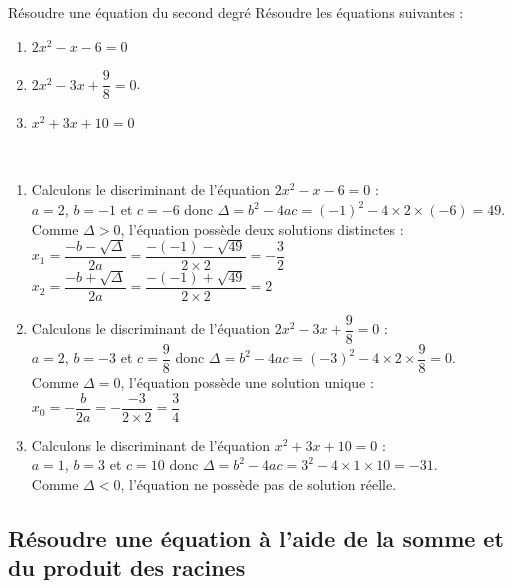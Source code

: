         
    \begin{methodeTitre}{Résoudre une équation du second degré}
         Résoudre les équations suivantes : 
        \begin{enumerate}
            \item $2x^2-x-6=0$
            \item $2x^2-3x+\dfrac{9}{8}=0$.
            \item $x^2+3x+10=0$
        \end{enumerate}
        \\
        \begin{enumerate}
            \item Calculons le discriminant de l'équation $2x^2-x-6=0$ :\\
            $a = 2$, $b = -1$ et $c = -6$ donc $\Delta = b^2-4ac = (-1)^2 - 4 \times 2 \times (-6) = 49$.\\
            Comme $\Delta > 0$, l'équation possède deux solutions distinctes :\\
            \hspace*{2cm} $x_1= \dfrac{-b-\sqrt{\Delta}}{2a}=\dfrac{-(-1)-\sqrt{49}}{2\times2}=-\dfrac{3}{2}$\\
            \hspace*{2cm} $x_2= \dfrac{-b+\sqrt{\Delta}}{2a}=\dfrac{-(-1)+\sqrt{49}}{2\times2}=2$
            \item Calculons le discriminant de l'équation $2x^2-3x+\dfrac{9}{8}=0$ :\\
            $a = 2$, $b = -3$ et $c = \dfrac{9}{8}$ donc $\Delta = b^2-4ac = (-3)^2 - 4 \times 2 \times \dfrac{9}{8} = 0$.\\
            Comme $\Delta = 0$, l'équation possède une solution unique :\\
            \hspace*{2cm} $x_0= -\dfrac{b}{2a}=-\dfrac{-3}{2\times2}=\dfrac{3}{4}$\\
            \item Calculons le discriminant de l'équation $x^2+3x+10=0$ :\\
            $a = 1$, $b = 3$ et $c = 10$ donc $\Delta = b^2-4ac = 3^2 - 4 \times 1 \times 10 = -31$.\\
            Comme $\Delta < 0$, l'équation ne possède pas de solution réelle.
        \end{enumerate}
    \end{methodeTitre}
    
\subsection{Résoudre une équation à l'aide de la somme et du produit des racines}
    
